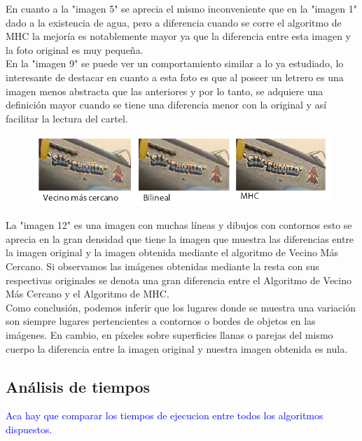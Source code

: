 \documentclass[a4paper]{article}
\begin{document}
En cuanto a la "imagen 5" se aprecia el mismo inconveniente que en la "imagen 1" dado a la existencia de agua, pero a diferencia cuando se corre el algoritmo de MHC la mejor\'ia es notablemente mayor ya que la diferencia entre esta imagen y la foto original es muy peque\~na.\\

En la "imagen 9" se puede ver un comportamiento similar a lo ya estudiado, lo interesante de destacar en cuanto a esta foto es que al poseer un letrero es una imagen menos abstracta que las anteriores y por lo tanto, se adquiere una definici\'on mayor cuando se tiene una diferencia menor con la original y as\'i facilitar la lectura del cartel.


\begin{figure}[h!]
	\caption{}
	\begin{center}
	\includegraphics[scale=0.05]{imagenes/comparacion/cartel}
	\label{cartel}
  \end{center}
\end{figure}


La "imagen 12" es una imagen con muchas l\'ineas y dibujos con contornos esto se aprecia en la gran densidad que tiene la imagen que muestra las diferencias entre la imagen original y la imagen obtenida mediante el algoritmo de Vecino M\'as Cercano. Si observamos las im\'agenes obtenidas mediante la resta con sus respectivas originales se denota una gran diferencia entre el Algoritmo de Vecino M\'as Cercano y el Algoritmo de MHC.\\

Como conclusi\'on, podemos inferir que los lugares donde se muestra una variaci\'on son siempre lugares pertencientes a contornos o bordes de objetos en las im\'agenes. En cambio, en p\'ixeles sobre superficies llanas o parejas del mismo cuerpo la diferencia entre la imagen original y nuestra imagen obtenida es nula.


\subsection{An\'alisis de tiempos}
\textcolor{blue}{Aca hay que comparar los tiempos de ejecucion entre todos los algoritmos dispuestos.}
\end{document}

